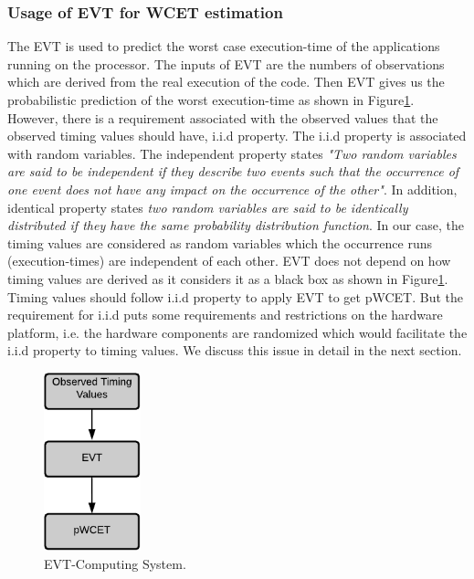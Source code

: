 \subsubsection{Usage of EVT for WCET estimation}
The EVT is used to predict the worst case execution-time of the applications running on the processor. The inputs of EVT are the numbers of observations which are derived from the real execution of the code. Then EVT gives us the probabilistic prediction of the worst execution-time as shown in Figure\ref{evt-process}.  However, there is a requirement associated with the observed values that the observed timing values should have, i.i.d property. The i.i.d  property is associated with random variables. The independent property states \textit{"Two random variables are said to be independent if they describe two events such that the occurrence of one event does not have any impact on the occurrence of the other"}. In addition, identical property states \textit{two random variables are said to be identically distributed if they have the same probability distribution function}. In our case, the timing values are considered as random variables which the occurrence runs (execution-times) are independent of each other.  EVT does not depend on  how timing values are derived as it considers it as a black box as shown in Figure\ref{evt-process}. Timing values should follow i.i.d property to apply EVT to get pWCET. But the requirement for i.i.d puts some requirements and restrictions on the hardware platform, i.e. the hardware components are randomized which would facilitate the i.i.d property to timing values. We discuss this issue in detail in the next section. 

\begin{figure}[tb!]
\centering
\includegraphics[width=0.25\textwidth]{figures/EVT-Process.pdf}
\caption{EVT-Computing System.}
\label{evt-process}
\end{figure}
 
